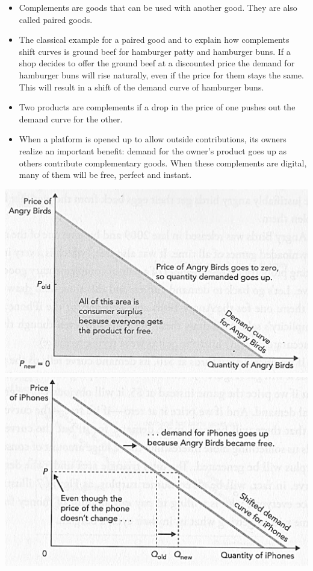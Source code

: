 \begin{itemize}
	\item Complements are goods that can be used with another good. They are also called paired goods.
	\item The classical example for a paired good and to explain how complements shift curves is ground beef for hamburger patty and hamburger buns. If a shop decides to offer the ground beef at a discounted price the demand for hamburger buns will rise naturally, even if the price for them stays the same. This will result in a shift of the demand curve of hamburger buns.
	\item Two products are complements if a drop in the price of one pushes out the demand curve for the other.
	\item When a platform is opened up to allow outside contributions, its owners realize an important benefit: demand for the owner’s product goes up as others contribute complementary goods. When these complements are digital, many of them will be free, perfect and instant.
\end{itemize}
\pagebreak
\begin{multicols}{2}
	\includegraphics[width=1\linewidth]{images/komp_produkte_4} 
	\includegraphics[width=1\linewidth]{images/komp_produkte_5}
\end{multicols}

